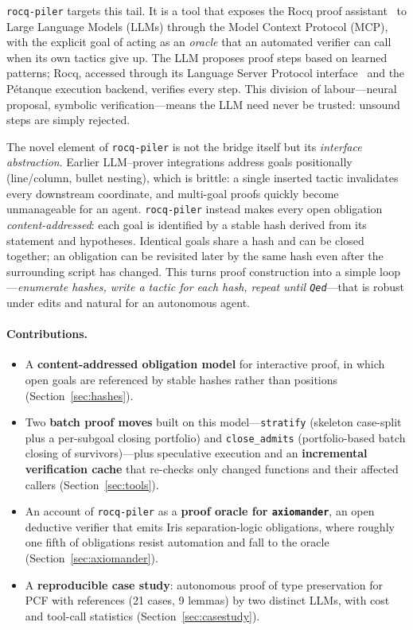 \documentclass[11pt,a4paper]{article}
\newcommand{\tool}{\texttt{rocq-piler}\xspace}
\newcommand{\axm}{\texttt{axiomander}\xspace}
\begin{document}
\tool targets this tail. It is a tool that exposes the Rocq proof
assistant~\cite{coq} to Large Language Models (LLMs) through the Model Context
Protocol (MCP), with the explicit goal of acting as an \emph{oracle} that an
automated verifier can call when its own tactics give up. The LLM proposes proof
steps based on learned patterns; Rocq, accessed through its Language Server
Protocol interface~\cite{gallego2022coqlsp} and the Pétanque execution backend,
verifies every step. This division of labour---neural proposal, symbolic
verification---means the LLM need never be trusted: unsound steps are simply
rejected.

The novel element of \tool is not the bridge itself but its \emph{interface
abstraction}. Earlier LLM--prover integrations address goals positionally
(line/column, bullet nesting), which is brittle: a single inserted tactic
invalidates every downstream coordinate, and multi-goal proofs quickly become
unmanageable for an agent. \tool instead makes every open obligation
\emph{content-addressed}: each goal is identified by a stable hash derived from
its statement and hypotheses. Identical goals share a hash and can be closed
together; an obligation can be revisited later by the same hash even after the
surrounding script has changed. This turns proof construction into a simple
loop---\emph{enumerate hashes, write a tactic for each hash, repeat until
\texttt{Qed}}---that is robust under edits and natural for an autonomous agent.

\paragraph{Contributions.}
\begin{itemize}
\item A \textbf{content-addressed obligation model} for interactive proof, in
  which open goals are referenced by stable hashes rather than positions
  (Section~\ref{sec:hashes}).
\item Two \textbf{batch proof moves} built on this model---\texttt{stratify}
  (skeleton case-split plus a per-subgoal closing portfolio) and
  \texttt{close\_admits} (portfolio-based batch closing of survivors)---plus
  speculative execution and an \textbf{incremental verification cache} that
  re-checks only changed functions and their affected callers
  (Section~\ref{sec:tools}).
\item An account of \tool as a \textbf{proof oracle for \axm}, an open
  deductive verifier that emits Iris separation-logic obligations, where roughly
  one fifth of obligations resist automation and fall to the oracle
  (Section~\ref{sec:axiomander}).
\item A \textbf{reproducible case study}: autonomous proof of type preservation
  for PCF with references (21 cases, 9 lemmas) by two distinct LLMs, with cost
  and tool-call statistics (Section~\ref{sec:casestudy}).
\end{itemize}
\end{document}
